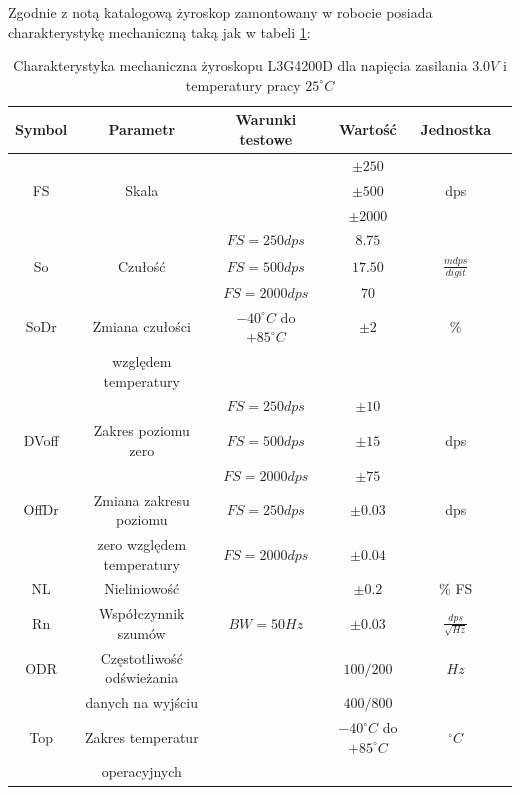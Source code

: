 Zgodnie z notą katalogową\cite{L3G4200DDataSheet} żyroskop zamontowany w robocie posiada charakterystykę mechaniczną taką jak w tabeli \ref{tab:L3G4200DMechChar}:

\begin{table}[hb]
\centering
\caption{Charakterystyka mechaniczna żyroskopu L3G4200D dla napięcia zasilania $3.0V$ i temperatury pracy $25^{\circ}C$}
   	\begin{tabular}{ | c | c | c | c | c | p{1.75cm} |} \hline
   		Symbol & Parametr & Warunki testowe & Wartość & Jednostka \\ \hline
   		& & & $\pm 250$ & \\
   		FS & Skala & & $\pm 500$ & dps\\
   		& & & $\pm 2000$ & \\ \hline
   		& & $FS = 250 dps$  & $8.75$  & \\
   		So  & Czułość & $FS = 500 dps$ & $17.50$  & $\frac{mdps}{digit}$ \\
   		& & $FS = 2000 dps$  & $70$  & \\ \hline
   		SoDr & Zmiana czułości & $-40^{\circ}C$ do $+85^{\circ}C$ & $\pm 2$  & \% \\
		& względem temperatury & & &  \\ \hline
		& & $FS = 250 dps$ & $\pm 10$  &  \\
   		DVoff & Zakres poziomu zero & $FS = 500 dps$  & $\pm 15$ & dps \\
   		& & $FS = 2000 dps$ & $\pm 75$ & \\ \hline
   		OffDr & Zmiana zakresu poziomu & $FS = 250 dps$  & $\pm 0.03$ & dps \\
   		& zero względem temperatury & $FS = 2000 dps$ & $\pm 0.04$ & \\ \hline
		NL & Nieliniowość & & $\pm 0.2$ & \% FS \\ \hline
		Rn & Współczynnik szumów & $BW = 50 Hz$ & $\pm 0.03$ & $\frac{dps}{\sqrt{Hz}}$ \\ \hline
		ODR & Częstotliwość odświeżania & & $100/200$ & $Hz$ \\
		& danych na wyjściu & & $400/800$ & \\ \hline
		Top & Zakres temperatur & & $-40^{\circ} C$ do $+85^{\circ} C$ & $^{\circ} C$ \\
		& operacyjnych & & & \\ \hline
   	\end{tabular}
\label{tab:L3G4200DMechChar}
\end{table}

